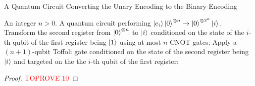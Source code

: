 \documentclass[a4paper,UKenglish,cleveref, autoref, thm-restate]{lipics-v2021}
\begin{document}
\begin{algorithm}[htbp]
    \caption{A Quantum Circuit Converting the Unary Encoding to the Binary Encoding}\label{alg:unary2binary} 
    \begin{algorithmic}[1]
    \REQUIRE An integer $n > 0$.
    \ENSURE A quantum circuit performing $\ket{e_i}\ket{0}^{\otimes n} \xrightarrow{} \ket{0}^{\otimes 2^n} \ket{i}$.
    \STATE Transform the second register from $\ket{0}^{\otimes n}$ to $\ket{i}$ conditioned on the state of the $i$-th qubit of the first register being $\ket{1}$ using at most $n$ CNOT gates;
    \STATE Apply a $(n+1)$-qubit Toffoli gate conditioned on the state of the second register being $\ket{i}$ and targeted on the  the $i$-th qubit of the first register;
    \ENDFOR
    \end{algorithmic}
\end{algorithm}

\begin{proof}\textcolor{red}{TOPROVE 10}\end{proof}
\end{document}
